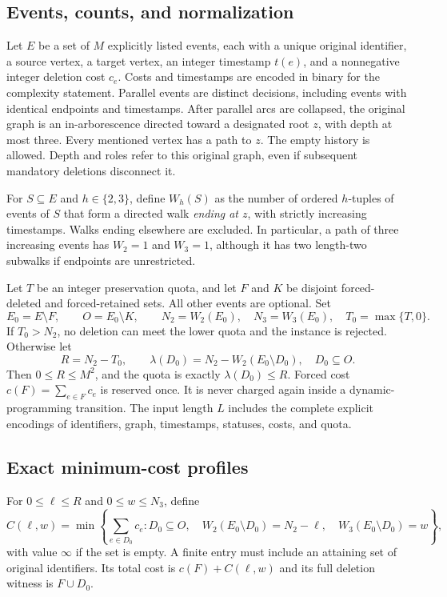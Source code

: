 \documentclass[11pt]{article}
\theoremstyle{remark}
\newcommand{\infv}{\infty}
\begin{document}
\subsection{Events, counts, and normalization}

Let $E$ be a set of $M$ explicitly listed events, each with a unique original
identifier, a source vertex, a target vertex, an integer timestamp $t(e)$, and
a nonnegative integer deletion cost $c_e$. Costs and timestamps are encoded
in binary for the complexity statement. Parallel events are distinct decisions,
including events with identical endpoints and timestamps. After parallel arcs
are collapsed, the original graph is an in-arborescence directed toward a
designated root $z$, with depth at most three. Every mentioned vertex has a path
to $z$. The empty history is allowed. Depth and roles refer to this original
graph, even if subsequent mandatory deletions disconnect it.

For $S\subseteq E$ and $h\in\{2,3\}$, define $W_h(S)$ as the number of ordered
$h$-tuples of events of $S$ that form a directed walk \emph{ending at $z$}, with
strictly increasing timestamps. Walks ending elsewhere are excluded. In particular, a path of
three increasing events has $W_2=1$ and $W_3=1$, although it has two length-two
subwalks if endpoints are unrestricted.

Let $T$ be an integer preservation quota, and let $F$ and $K$ be disjoint
forced-deleted and forced-retained sets. All other
events are optional. Set
\[
 E_0=E\setminus F,\qquad O=E_0\setminus K,\qquad
 N_2=W_2(E_0),\quad N_3=W_3(E_0),\quad T_0=\max\{T,0\}.
\]
If $T_0>N_2$, no deletion can meet the lower quota and the instance is rejected.
Otherwise let
\begin{equation}
 R=N_2-T_0,\qquad
 \lambda(D_0)=N_2-W_2(E_0\setminus D_0),\quad D_0\subseteq O.
 \label{eq:parameter}
\end{equation}
Then $0\le R\le M^2$, and the quota is exactly $\lambda(D_0)\le R$.
Forced cost $c(F)=\sum_{e\in F}c_e$ is reserved once. It is never charged again
inside a dynamic-programming transition. The input length $L$ includes the
complete explicit encodings of identifiers, graph, timestamps, statuses, costs,
and quota.

\subsection{Exact minimum-cost profiles}

For $0\le\ell\le R$ and $0\le w\le N_3$, define
\begin{equation}
 C(\ell,w)=\min\left\{
 \sum_{e\in D_0}c_e:
 D_0\subseteq O,\quad
 W_2(E_0\setminus D_0)=N_2-\ell,\quad
 W_3(E_0\setminus D_0)=w
 \right\},
 \label{eq:profile}
\end{equation}
with value $\infv$ if the set is empty. A finite entry must include an attaining
set of original identifiers. Its total cost is $c(F)+C(\ell,w)$ and its full
deletion witness is $F\cup D_0$.
\end{document}
